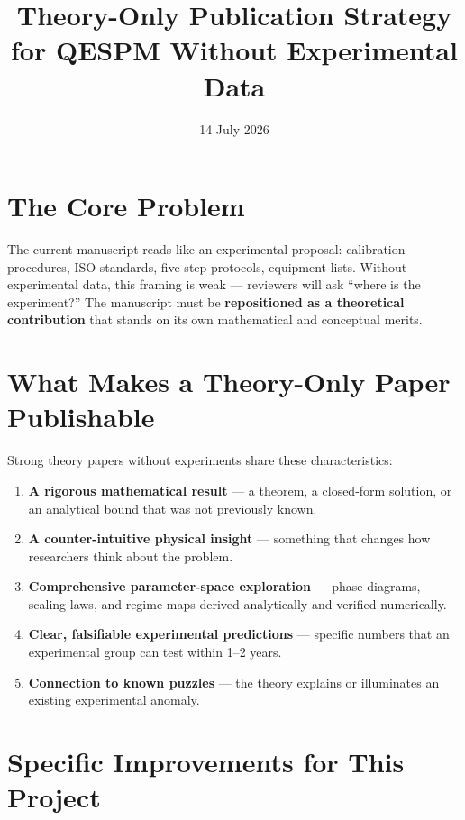 \documentclass[11pt,a4paper]{article}
\begin{document}
\title{\bfseries Theory-Only Publication Strategy\\
       for QESPM Without Experimental Data}
\date{14 July 2026}
\maketitle

\section{The Core Problem}

The current manuscript reads like an experimental proposal: calibration
procedures, ISO standards, five-step protocols, equipment lists.  Without
experimental data, this framing is weak --- reviewers will ask ``where is
the experiment?''  The manuscript must be \textbf{repositioned as a
theoretical contribution} that stands on its own mathematical and conceptual
merits.

\section{What Makes a Theory-Only Paper Publishable}

Strong theory papers without experiments share these characteristics:

\begin{enumerate}[label=(\roman*)]
    \item \textbf{A rigorous mathematical result} --- a theorem, a closed-form
          solution, or an analytical bound that was not previously known.
    \item \textbf{A counter-intuitive physical insight} --- something that
          changes how researchers think about the problem.
    \item \textbf{Comprehensive parameter-space exploration} --- phase
          diagrams, scaling laws, and regime maps derived analytically
          and verified numerically.
    \item \textbf{Clear, falsifiable experimental predictions} --- specific
          numbers that an experimental group can test within 1--2 years.
    \item \textbf{Connection to known puzzles} --- the theory explains or
          illuminates an existing experimental anomaly.
\end{enumerate}

\section{Specific Improvements for This Project}
\end{document}
